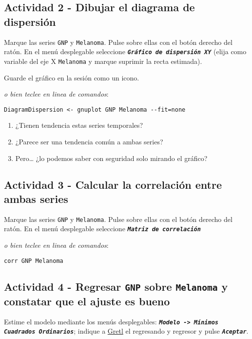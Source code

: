 \documentclass[11pt]{article}
\begin{document}
\vspace{-3pt}

\subsection{Actividad 2 - Dibujar el diagrama de dispersión}
\label{sec:org7223072}
Marque las series \texttt{GNP} y \texttt{Melanoma}. Pulse sobre ellas con el botón
derecho del ratón. En el menú desplegable seleccione \textbf{\emph{\texttt{Gráfico de
dispersión XY}}} (elija como variable del eje X \texttt{Melanoma} y marque
suprimir la recta estimada).

Guarde el gráfico en la sesión como un icono.

{\vspace{1pt} \footnotesize \color{gray!70!black}
\emph{o bien teclee en linea de comandos}:
\begin{verbatim}
DiagramDispersion <- gnuplot GNP Melanoma --fit=none
\end{verbatim}
}

\vspace{-3pt}

\begin{enumerate}
\item ¿Tienen tendencia estas series temporales?
\item ¿Parece ser una tendencia común a ambas series?
\item Pero\ldots{} ¿lo podemos saber con seguridad solo mirando el gráfico?
\end{enumerate}

\subsection{Actividad 3 - Calcular la correlación entre ambas series}
\label{sec:orgc7c229d}
Marque las series \texttt{GNP} y \texttt{Melanoma}. Pulse sobre ellas con el botón
derecho del ratón. En el menú desplegable seleccione \textbf{\emph{\texttt{Matriz de
correlación}}}

{\vspace{0pt} \footnotesize \color{gray!70!black}
\emph{o bien teclee en linea de comandos}:
\begin{verbatim}
corr GNP Melanoma
\end{verbatim}
}

\subsection{Actividad 4 - Regresar \texttt{GNP} sobre \texttt{Melanoma} y constatar que el ajuste es bueno}
\label{sec:org37cd16b}
Estime el modelo mediante los menús desplegables: \textbf{\emph{\texttt{Modelo -> Mínimos
  Cuadrados Ordinarios}}}; indique a \href{https://gretl.sourceforge.net/es.html}{Gretl} el regresando y regresor y
  pulse \textbf{\emph{\texttt{Aceptar}}}.
\end{document}
